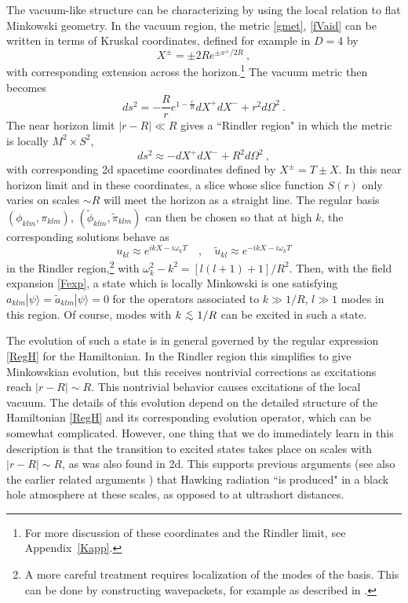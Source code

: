 \documentclass[12pt]{article}
\numberwithin{equation}{section}
\newcommand{\beq}{\begin{equation}}
\newcommand{\eeq}{\end{equation}}
\def\lesssim{~\mbox{\raisebox{-.6ex}{$\stackrel{<}{\sim}$}}~}
\begin{document}
The vacuum-like structure can be characterizing by using the local relation to flat Minkowski geometry.  In the vacuum region, the metric \eqref{gmet}, \eqref{fVaid} can be written in terms of Kruskal coordinates, defined for example  in $D=4$ by 
\beq\label{Krudef}
X^\pm = \pm 2R e^{\pm x^\pm/2R}\ ,
\eeq
with corresponding extension across the horizon.\footnote{For more discussion of these coordinates and the Rindler limit, see Appendix~\ref{Kapp}.} The vacuum metric then becomes
\beq \label{Krmet}
ds^2 = -\frac{R}{r}e^{1-\frac{r}{R}}dX^+ dX^- + r^2 d\Omega^2\ .
\eeq
The near horizon limit $|r-R|\ll R$ gives a ``Rindler region"\cite{GiLi3} in which the metric is locally $M^2 \times S^2$,
\beq\label{prodmet}
ds^2 \approx -dX^+ dX^- + R^2 d\Omega^2\ ,
\eeq
 with corresponding 2d spacetime coordinates defined by $X^\pm = T\pm X$.  In this near horizon limit and in these coordinates, a slice whose slice function $S(r)$ only varies on scales $\sim R$ will meet the horizon as a straight line.  The regular basis $(\phi_{klm},\pi_{klm})$, $(\tilde \phi_{klm},\tilde \pi_{klm})$ can then be chosen so that at high $k$, the corresponding solutions behave as
 \beq\label{KruskalModes}
 u_{kl}\approx e^{ikX-i\omega_k T}\quad , \quad \tilde u_{kl}\approx e^{-ikX-i\omega_k T}
 \eeq
 in the Rindler region,\footnote{A more careful treatment requires localization of the modes of the basis.  This can be done by constructing wavepackets, for example as described in \cite{Hawk}\cite{GiNe}\cite{SE2d}.} with $\omega_k^2-k^2=[l(l+1)+1]/R^2$.  Then, with the field expansion \eqref{Fexp}, a state which is locally Minkowski is one satisfying $a_{klm}|\psi\rangle=\tilde a_{klm}|\psi\rangle=0$ for the operators associated to $k\gg 1/R$, $l\gg 1$ modes in this region.  Of course, modes with $k\lesssim 1/R$ can be excited in such a state.
 
The evolution of such a state is in general governed by the regular expression \eqref{RegH} for the Hamiltonian.  In the Rindler region this simplifies to give Minkowskian evolution, but this receives nontrivial corrections as excitations reach $|r-R|\sim R$.  This nontrivial behavior causes excitations of the local vacuum.  The details of this evolution depend on the detailed structure of the Hamiltonian \eqref{RegH} and its corresponding evolution operator, which can be somewhat complicated.  However, one thing that we do immediately learn in this description is that the transition to excited states takes place on scales with $|r-R|\sim R$, as was also found in 2d\cite{SEHS,SE2d}.  This supports previous arguments\cite{SGBoltz} (see also the earlier related arguments \cite{Unru-origin,Full,Bard}) that Hawking radiation ``is produced" in a black hole atmosphere at these scales, as opposed to at ultrashort distances.  
\end{document}
